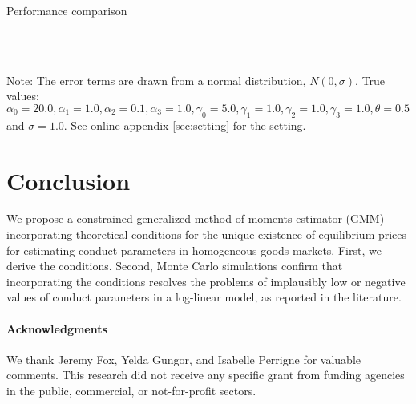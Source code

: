 \documentclass[11pt, a4paper]{article}
\begin{document}
\begin{table}[!htbp]
  \begin{center}
      \caption{Performance comparison}
      \label{tb:loglinear_loglinear_sigma_1_simultaneous_non_constraint_theta_constraint_bias_rmse} 
      \\
    \\
  \end{center}
  \footnotesize
  Note: The error terms are drawn from a normal distribution, $N(0, \sigma)$. True values: $\alpha_0=20.0,\alpha_1=1.0,\alpha_2=0.1,\alpha_3=1.0,\gamma_0=5.0,\gamma_1=1.0,\gamma_2=1.0,\gamma_3=1.0,\theta=0.5$ and $\sigma=1.0$. See online appendix \ref{sec:setting} for the setting.
\end{table} 



\section{Conclusion}
We propose a constrained generalized method of moments estimator (GMM) incorporating theoretical conditions for the unique existence of equilibrium prices for estimating conduct parameters in homogeneous goods markets.
First, we derive the conditions.
Second, Monte Carlo simulations confirm that incorporating the conditions resolves the problems of implausibly low or negative values of conduct parameters in a log-linear model, as reported in the literature. 


\paragraph{Acknowledgments}
We thank Jeremy Fox, Yelda Gungor, and Isabelle Perrigne for valuable comments. This research did not receive any specific grant from funding agencies in the public, commercial, or not-for-profit sectors. 
\end{document}
